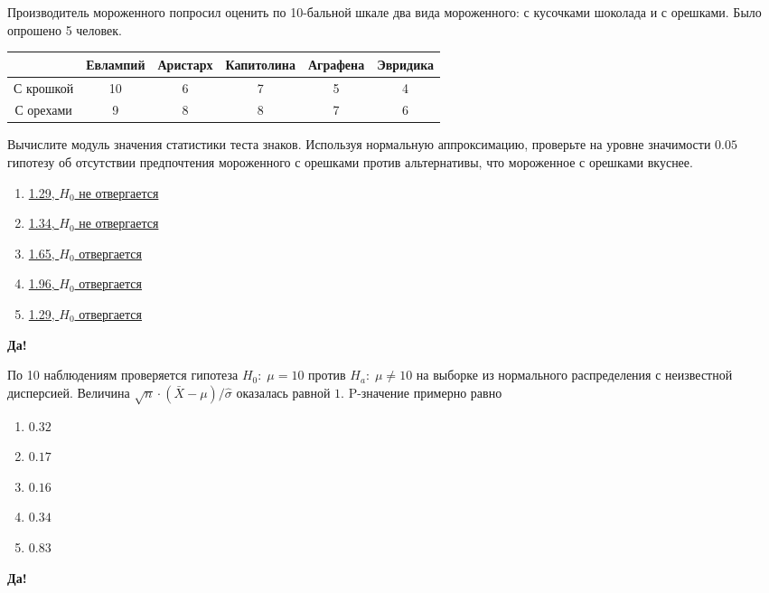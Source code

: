 \documentclass[t]{beamer}
\begin{document}
 \begin{frame} \label{62-Yes} 
\begin{block}{62} 

 Производитель мороженного попросил оценить по 10-бальной шкале два вида мороженного: с кусочками шоколада и с орешками. Было опрошено 5 человек.


 \begin{tabular}{c|ccccc}
  & Евлампий & Аристарх & Капитолина & Аграфена & Эвридика \\
 \hline
С крошкой & 10 & 6 & 7 & 5 & 4 \\
С орехами & 9 & 8 & 8 & 7 & 6 \\
 \end{tabular}


Вычислите модуль значения статистики теста знаков. Используя нормальную аппроксимацию, проверьте на уровне значимости $0.05$ гипотезу об отсутствии предпочтения мороженного с орешками против альтернативы, что мороженное с орешками вкуснее.
 


 \end{block} 
\begin{enumerate} 
\item[] \hyperlink{62-No}{\beamergotobutton{} 1.29, $H_0$ не отвергается}
\item[] \hyperlink{62-No}{\beamergotobutton{} 1.34, $H_0$ не отвергается}
\item[] \hyperlink{62-No}{\beamergotobutton{} 1.65, $H_0$ отвергается}
\item[] \hyperlink{62-Yes}{\beamergotobutton{} 1.96, $H_0$ отвергается}
\item[] \hyperlink{62-No}{\beamergotobutton{} 1.29, $H_0$ отвергается}
\end{enumerate} 

 \textbf{Да!} 
 \hyperlink{63}{}\end{frame} 


 \begin{frame} \label{63-Yes} 
\begin{block}{63} 

По 10 наблюдениям проверяется гипотеза $H_0: \; \mu=10$ против $H_a: \; \mu \neq 10$ на выборке из нормального распределения с неизвестной дисперсией. Величина $\sqrt{n}\cdot (\bar{X}-\mu)/\hat{\sigma}$ оказалась равной $1$. P-значение примерно равно
 


 \end{block} 
\begin{enumerate} 
\item[] \hyperlink{63-No}{\beamergotobutton{} $0.32$}
\item[] \hyperlink{63-No}{\beamergotobutton{} $0.17$}
\item[] \hyperlink{63-Yes}{\beamergotobutton{} $0.16$}
\item[] \hyperlink{63-No}{\beamergotobutton{} $0.34$}
\item[] \hyperlink{63-No}{\beamergotobutton{} $0.83$}
\end{enumerate} 

 \textbf{Да!} 
 \hyperlink{64}{}\end{frame} 
\end{document}
